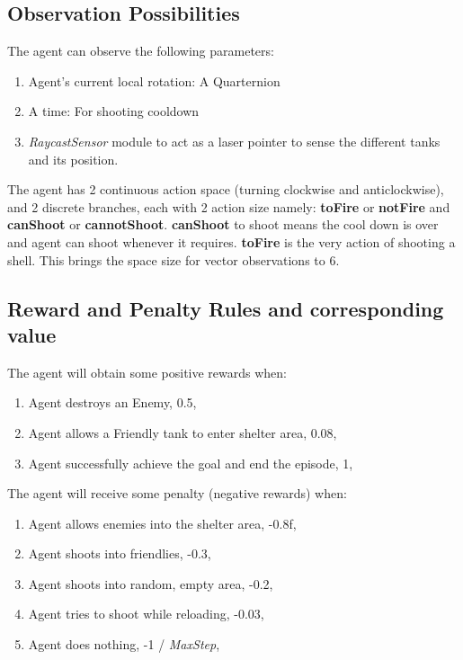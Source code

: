 \subsection{Observation Possibilities}

The agent can observe the following parameters:
\begin{enumerate}
    \item Agent's current local rotation: A Quarternion
    \item A time: For shooting cooldown
    \item \textit{RaycastSensor} module to act as a laser pointer to sense the different tanks and its position.
\end{enumerate}

The agent has 2 continuous action space (turning clockwise and anticlockwise), and 2 discrete branches, each with 2 action size namely: \textbf{toFire} or \textbf{notFire} and \textbf{canShoot} or \textbf{cannotShoot}. \textbf{canShoot} to shoot means the cool down is over and agent can shoot whenever it requires. \textbf{toFire} is the very action of shooting a shell. This brings the space size for vector observations to 6.

\subsection{Reward and Penalty Rules and corresponding value}
The agent will obtain some positive rewards when:
\begin{enumerate}
    \item Agent destroys an Enemy, 0.5,
    \item Agent allows a Friendly tank to enter shelter area, 0.08,
    \item Agent successfully achieve the goal and end the episode, 1,
\end{enumerate}
The agent will receive some penalty (negative rewards) when:
\begin{enumerate}
    \item Agent allows enemies into the shelter area, -0.8f,
    \item Agent shoots into friendlies, -0.3,
    \item Agent shoots into random, empty area, -0.2,
    \item Agent tries to shoot while reloading, -0.03,
    \item Agent does nothing, -1 / \textit{MaxStep},
\end{enumerate}

